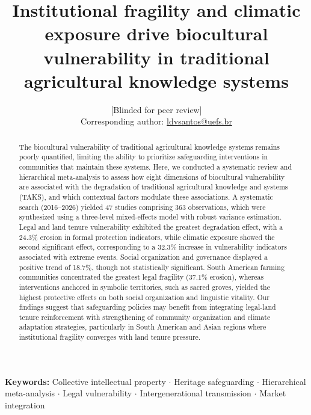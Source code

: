 \documentclass[12pt,a4paper]{article}
\begin{document}
\title{Institutional fragility and climatic exposure drive biocultural vulnerability in traditional agricultural knowledge systems}

\author{[Blinded for peer review]\\[6pt]
\small Corresponding author: \href{mailto:ldvsantos@uefs.br}{ldvsantos@uefs.br}}

\date{}
\maketitle

\begin{abstract}
The biocultural vulnerability of traditional agricultural knowledge systems remains poorly quantified, limiting the ability to prioritize safeguarding interventions in communities that maintain these systems. Here, we conducted a systematic review and hierarchical meta-analysis to assess how eight dimensions of biocultural vulnerability are associated with the degradation of traditional agricultural knowledge and systems (TAKS), and which contextual factors modulate these associations. A systematic search (2016--2026) yielded 47 studies comprising 363 observations, which were synthesized using a three-level mixed-effects model with robust variance estimation. Legal and land tenure vulnerability exhibited the greatest degradation effect, with a 24.3\% erosion in formal protection indicators, while climatic exposure showed the second significant effect, corresponding to a 32.3\% increase in vulnerability indicators associated with extreme events. Social organization and governance displayed a positive trend of 18.7\%, though not statistically significant. South American farming communities concentrated the greatest legal fragility (37.1\% erosion), whereas interventions anchored in symbolic territories, such as sacred groves, yielded the highest protective effects on both social organization and linguistic vitality. Our findings suggest that safeguarding policies may benefit from integrating legal-land tenure reinforcement with strengthening of community organization and climate adaptation strategies, particularly in South American and Asian regions where institutional fragility converges with land tenure pressure.
\end{abstract}

\medskip
\noindent\textbf{Keywords:} Collective intellectual property $\cdot$ Heritage safeguarding $\cdot$ Hierarchical meta-analysis $\cdot$ Legal vulnerability $\cdot$ Intergenerational transmission $\cdot$ Market integration
\end{document}
